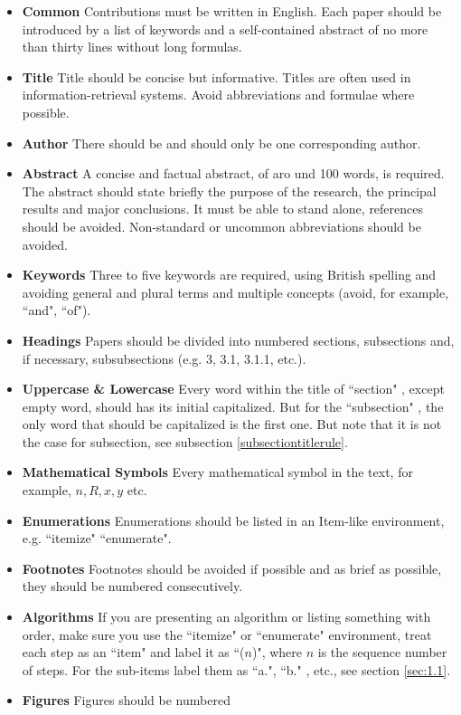 \documentclass[print]{jicspack}
\begin{document}
\begin{itemize}
\item{\bf Common} Contributions must be written in English. Each
paper should be introduced by a list of keywords and a
self-contained abstract of no more than thirty lines without long
formulas. \item{\bf Title} Title should be concise but
informative. Titles are often used in information-retrieval
systems. Avoid abbreviations and formulae where possible.
\item{\bf Author} There should be and should only be one
corresponding author. \item{\bf Abstract} A concise and factual
abstract, of aro und 100 words, is required. The abstract should
state briefly the purpose of the research, the principal results
and major conclusions. It must be able to stand alone, references
should be avoided. Non-standard or uncommon abbreviations should
be avoided. \item{\bf Keywords} Three to five keywords are
required, using British spelling and avoiding general and plural
terms and multiple concepts (avoid, for example, ``and", ``of").
\item{\bf Headings} Papers should be divided into numbered
sections, subsections and, if necessary, subsubsections (e.g. 3,
3.1, 3.1.1, etc.). \item{\bf Uppercase \& Lowercase} Every word
within the title of ``section" , except empty word, should has its
initial capitalized. But for the ``subsection" , the only word
that should be capitalized is the first one. But note that it is
not the case for subsection, see subsection
\ref{subsectiontitlerule}. \item{\bf Mathematical Symbols} Every
mathematical symbol in the text, for example, $n, R, x, y$ etc.
\item{\bf Enumerations} Enumerations should be listed in an
Item-like environment, e.g. ``itemize" ``enumerate". \item{\bf
Footnotes} Footnotes should be avoided if possible and as brief as
possible, they should be numbered consecutively. \item{\bf
Algorithms} If you are presenting an algorithm or listing
something with order, make sure you use the ``itemize" or
``enumerate"  environment, treat each step as an ``item" and label
it as ``($n$)", where $n$ is the sequence number of steps. For the
sub-items label them as ``a.", ``b." , etc., see section
\ref{sec:1.1}. \item{\bf Figures} Figures should be numbered

\end{itemize}
\end{document}
